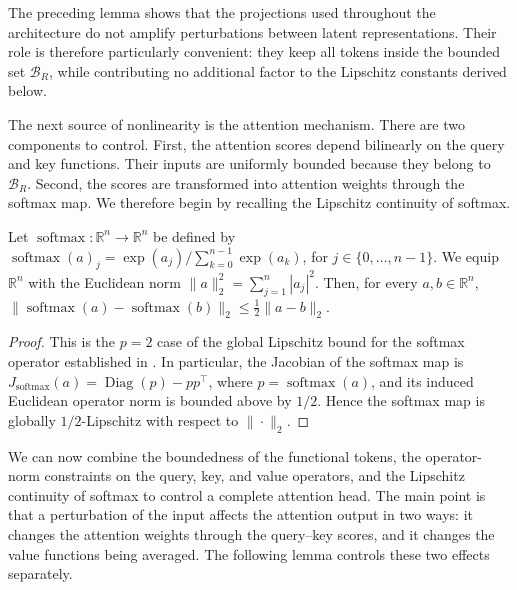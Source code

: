 The preceding lemma shows that the projections used throughout the architecture do not amplify perturbations between latent representations. Their role is therefore particularly convenient: they keep all tokens inside the bounded set \(\mathcal B_R\), while contributing no additional factor to the Lipschitz constants derived below.

The next source of nonlinearity is the attention mechanism. There are two components to control. First, the attention scores depend bilinearly on the query and key functions. Their inputs are uniformly bounded because they belong to \(\mathcal B_R\). Second, the scores are transformed into attention weights through the softmax map. We therefore begin by recalling the Lipschitz continuity of softmax.

\begin{lemma}
\label{lem:Lipschitz continuity of softmax}
Let \(\operatorname{softmax}:\mathbb R^n\to\mathbb R^n\) be defined by \(\operatorname{softmax}(a)_j=\exp(a_j)/\sum_{k=0}^{n-1}\exp(a_k)\), for \(j\in\{0,\ldots,n-1\}\). We equip \(\mathbb R^n\) with the Euclidean norm \(\|a\|_2^2=\sum_{j=1}^n|a_j|^2\). Then, for every \(a,b\in\mathbb R^n\), \(\|\operatorname{softmax}(a)-\operatorname{softmax}(b)\|_2\leqslant\frac12\|a-b\|_2\).
\end{lemma}

\begin{proof}
This is the \(p=2\) case of the global Lipschitz bound for the softmax operator established in \cite[Theorem~1]{Nair2026}. In particular, the Jacobian of the softmax map is \(J_{\operatorname{softmax}}(a)=\operatorname{Diag}(p)-pp^\top\), where \(p=\operatorname{softmax}(a)\), and its induced Euclidean operator norm is bounded above by \(1/2\). Hence the softmax map is globally \(1/2\)-Lipschitz with respect to \(\|\cdot\|_2\).
\end{proof}

We can now combine the boundedness of the functional tokens, the operator-norm constraints on the query, key, and value operators, and the Lipschitz continuity of softmax to control a complete attention head. The main point is that a perturbation of the input affects the attention output in two ways: it changes the attention weights through the query--key scores, and it changes the value functions being averaged. The following lemma controls these two effects separately.

